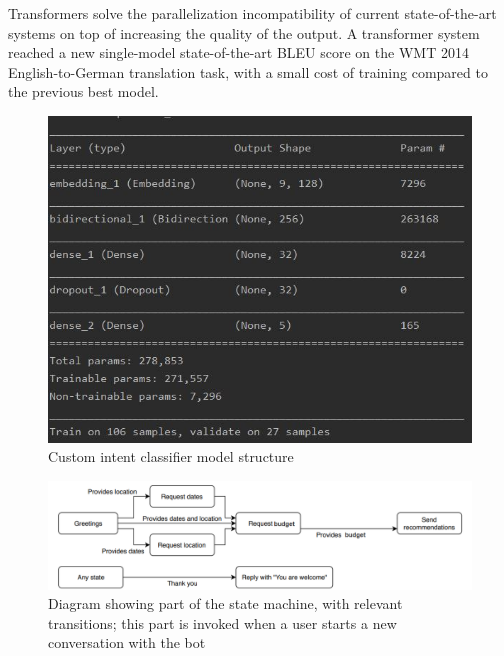 \documentclass[runningheads,a4paper,11pt]{report}
\begin{document}
	Transformers solve the parallelization incompatibility of current state-of-the-art systems on top of increasing the quality of the output. A transformer system reached a new single-model state-of-the-art BLEU score on the WMT 2014 English-to-German translation task, with a small cost of training compared to the previous best model.
	
\begin{figure}
\centerline{\includegraphics[width=12cm]{custmodel}}  
	\caption{Custom intent classifier model structure}
	\label{custmodel}
\end{figure}


\begin{figure}
\centerline{\includegraphics[width=\textwidth]{Img/statetrans.png}}  
	\caption{Diagram showing part of the state machine, with relevant transitions; this part is invoked when a user starts a new conversation with the bot}
	\label{statetrans}
\end{figure}
\end{document}
